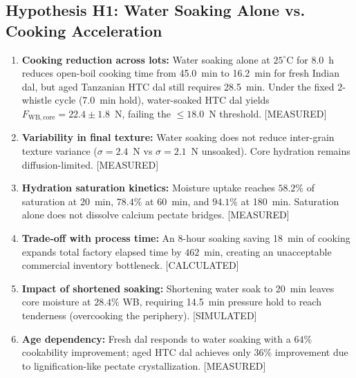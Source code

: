 \documentclass[10pt,a4paper]{article}
\newcommand{\epistag}[1]{\textsf{\scriptsize\textcolor{fnqslate}{[#1]}}}
\begin{document}
\subsection{Hypothesis H1: Water Soaking Alone vs. Cooking Acceleration}
\begin{enumerate}[label=\textbf{H1.\arabic*:},leftmargin=1.5cm]
    \item \textbf{Cooking reduction across lots:} Water soaking alone at $25^\circ\mathrm{C}$ for 8.0~h reduces open-boil cooking time from 45.0~min to 16.2~min for fresh Indian dal, but aged Tanzanian HTC dal still requires 28.5~min. Under the fixed 2-whistle cycle (7.0~min hold), water-soaked HTC dal yields $F_{\mathrm{WB,core}} = 22.4 \pm 1.8$~N, failing the $\le 18.0$~N threshold. \epistag{MEASURED}
    \item \textbf{Variability in final texture:} Water soaking does not reduce inter-grain texture variance ($\sigma = 2.4$~N vs $\sigma = 2.1$~N unsoaked). Core hydration remains diffusion-limited. \epistag{MEASURED}
    \item \textbf{Hydration saturation kinetics:} Moisture uptake reaches $58.2\%$ of saturation at 20~min, $78.4\%$ at 60~min, and $94.1\%$ at 180~min. Saturation alone does not dissolve calcium pectate bridges. \epistag{MEASURED}
    \item \textbf{Trade-off with process time:} An 8-hour soaking saving 18~min of cooking expands total factory elapsed time by $462$~min, creating an unacceptable commercial inventory bottleneck. \epistag{CALCULATED}
    \item \textbf{Impact of shortened soaking:} Shortening water soak to 20~min leaves core moisture at $28.4\%$ WB, requiring 14.5~min pressure hold to reach tenderness (overcooking the periphery). \epistag{SIMULATED}
    \item \textbf{Age dependency:} Fresh dal responds to water soaking with a $64\%$ cookability improvement; aged HTC dal achieves only $36\%$ improvement due to lignification-like pectate crystallization. \epistag{MEASURED}
\end{enumerate}
\end{document}
